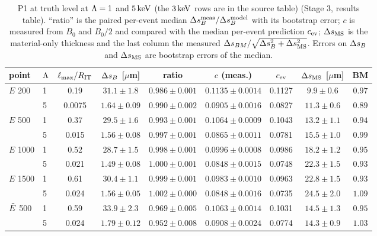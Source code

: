 \begin{table}[htbp]
\centering
\footnotesize
\setlength{\tabcolsep}{4pt}
\caption{P1 at truth level at $\Lambda=1$ and $5\,\mathrm{keV}$ (the $3\,\mathrm{keV}$ rows are in the source table) (Stage 3,  results table). ``ratio'' is the
paired per-event median $\Delta s_B^{\rm meas}/\Delta s_B^{\rm model}$ with its bootstrap error; $c$ is measured from $B_0$ and
$B_0/2$ and compared with the median per-event prediction $c_{\rm ev}$; $\Delta s_{\rm MS}$ is the material-only thickness and the
last column the measured $\Delta s_{BM}/\sqrt{\Delta s_B^2+\Delta s_{\rm MS}^2}$. Errors on $\Delta s_B$ and $\Delta s_{\rm MS}$ are bootstrap errors of the median.}
\label{tab:p1}
\begin{tabular}{llccccccc}
\toprule
point & $\Lambda$ & $\ell_{\max}/R_{\rm IT}$ & $\Delta s_B$ [$\mu$m] & ratio & $c$ (meas.) & $c_{\rm ev}$ & $\Delta s_{\rm MS}$ [$\mu$m] & BM\\
\midrule
$E$ 200  & 1 & 0.19  & $31.1\pm1.8$   & $0.986\pm0.001$ & $0.1135\pm0.0014$ & 0.1127 & $9.9\pm0.6$ & $0.97$\\
         & 5 & 0.0075& $1.64\pm0.09$  & $0.990\pm0.002$ & $0.0905\pm0.0016$ & 0.0827 & $11.3\pm0.6$ & $0.89$\\
$E$ 500  & 1 & 0.37  & $29.5\pm1.6$   & $0.993\pm0.001$ & $0.1064\pm0.0009$ & 0.1043 & $13.2\pm1.1$ & $0.94$\\
         & 5 & 0.015 & $1.56\pm0.08$  & $0.997\pm0.001$ & $0.0865\pm0.0011$ & 0.0781 & $15.5\pm1.0$ & $0.99$\\
$E$ 1000 & 1 & 0.52  & $28.7\pm1.5$   & $0.998\pm0.001$ & $0.0996\pm0.0008$ & 0.0986 & $18.2\pm1.2$ & $0.95$\\
         & 5 & 0.021 & $1.49\pm0.08$  & $1.000\pm0.001$ & $0.0848\pm0.0015$ & 0.0748 & $22.3\pm1.5$ & $0.93$\\
$E$ 1500 & 1 & 0.61  & $30.4\pm1.1$   & $0.999\pm0.001$ & $0.0983\pm0.0010$ & 0.0963 & $22.8\pm1.5$ & $0.93$\\
         & 5 & 0.024 & $1.56\pm0.05$  & $1.002\pm0.000$ & $0.0848\pm0.0016$ & 0.0735 & $24.5\pm2.0$ & $1.09$\\
$\tilde{E}$ 500 & 1 & 0.59 & $33.9\pm2.3$ & $0.969\pm0.005$ & $0.1063\pm0.0014$ & 0.1031 & $14.5\pm1.3$ & $0.95$\\
         & 5 & 0.024 & $1.79\pm0.12$  & $0.952\pm0.008$ & $0.0908\pm0.0024$ & 0.0774 & $14.3\pm0.9$ & $1.03$\\
\bottomrule
\end{tabular}
\end{table}

